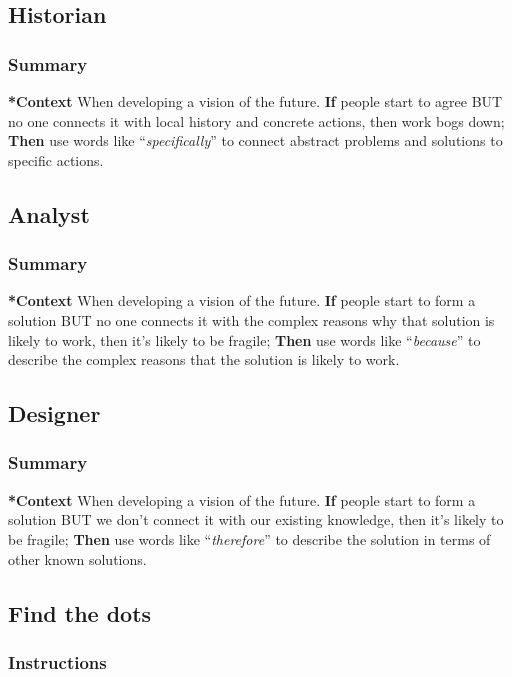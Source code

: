 \documentclass[11pt]{article}
\begin{document}
\subsection{Historian}
\label{57d46961-a056-435e-85d2-27ab6e0de7f6}
\subsubsection{Summary}
\label{sec:org2436bdb}

\textbf{*Context} When developing a vision of the future. \textbf{If} people start to
agree BUT no one connects it with local history and concrete actions,
then work bogs down; \textbf{Then} use words like ``\emph{specifically}'' to connect
abstract problems and solutions to specific actions.
\subsection{Analyst}
\label{5826c7d9-8962-433d-83c5-27a5196908ea}
\subsubsection{Summary}
\label{sec:orgc01c7c1}

\textbf{*Context} When developing a vision of the future. \textbf{If} people start to
form a solution BUT no one connects it with the complex reasons why that
solution is likely to work, then it's likely to be fragile; \textbf{Then} use
words like ``\emph{because}'' to describe the complex reasons that the solution
is likely to work.
\subsection{Designer}
\label{48a1d6a3-800d-46bd-8a4a-0d3414ecf150}
\subsubsection{Summary}
\label{sec:org68ffc62}

\textbf{*Context} When developing a vision of the future. \textbf{If} people start to
form a solution BUT we don't connect it with our existing knowledge,
then it's likely to be fragile; \textbf{Then} use words like ``\emph{therefore}'' to
describe the solution in terms of other known solutions.
\subsection{Find the dots}
\label{a853be79-85c1-4ffa-9750-459192c539e8}
\subsubsection{Instructions}
\label{sec:orgeaa3865}
\end{document}

